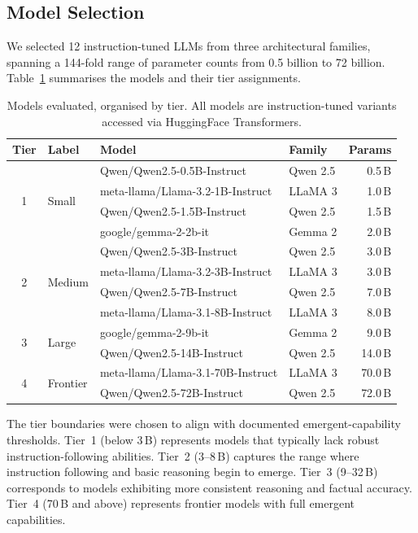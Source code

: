\documentclass[11pt,a4paper]{article}
\begin{document}
\subsection{Model Selection}
\label{sec:models}

We selected 12 instruction-tuned LLMs from three architectural families, spanning a 144-fold range of parameter counts from 0.5 billion to 72 billion.
Table~\ref{tab:models} summarises the models and their tier assignments.

\begin{table}[t]
\centering
\caption{Models evaluated, organised by tier. All models are instruction-tuned variants accessed via HuggingFace Transformers.}
\label{tab:models}
\small
\begin{tabular}{@{}clllr@{}}
\toprule
\textbf{Tier} & \textbf{Label} & \textbf{Model} & \textbf{Family} & \textbf{Params} \\
\midrule
\multirow{4}{*}{1} & \multirow{4}{*}{Small}
  & Qwen/Qwen2.5-0.5B-Instruct       & Qwen 2.5 & 0.5\,B \\
& & meta-llama/Llama-3.2-1B-Instruct  & LLaMA 3  & 1.0\,B \\
& & Qwen/Qwen2.5-1.5B-Instruct       & Qwen 2.5 & 1.5\,B \\
& & google/gemma-2-2b-it              & Gemma 2  & 2.0\,B \\
\midrule
\multirow{4}{*}{2} & \multirow{4}{*}{Medium}
  & Qwen/Qwen2.5-3B-Instruct         & Qwen 2.5 & 3.0\,B \\
& & meta-llama/Llama-3.2-3B-Instruct  & LLaMA 3  & 3.0\,B \\
& & Qwen/Qwen2.5-7B-Instruct         & Qwen 2.5 & 7.0\,B \\
& & meta-llama/Llama-3.1-8B-Instruct  & LLaMA 3  & 8.0\,B \\
\midrule
\multirow{2}{*}{3} & \multirow{2}{*}{Large}
  & google/gemma-2-9b-it              & Gemma 2  & 9.0\,B \\
& & Qwen/Qwen2.5-14B-Instruct        & Qwen 2.5 & 14.0\,B \\
\midrule
\multirow{2}{*}{4} & \multirow{2}{*}{Frontier}
  & meta-llama/Llama-3.1-70B-Instruct & LLaMA 3  & 70.0\,B \\
& & Qwen/Qwen2.5-72B-Instruct        & Qwen 2.5 & 72.0\,B \\
\bottomrule
\end{tabular}
\end{table}

The tier boundaries were chosen to align with documented emergent-capability thresholds.
Tier~1 (below 3\,B) represents models that typically lack robust instruction-following abilities.
Tier~2 (3--8\,B) captures the range where instruction following and basic reasoning begin to emerge.
Tier~3 (9--32\,B) corresponds to models exhibiting more consistent reasoning and factual accuracy.
Tier~4 (70\,B and above) represents frontier models with full emergent capabilities.
\end{document}
